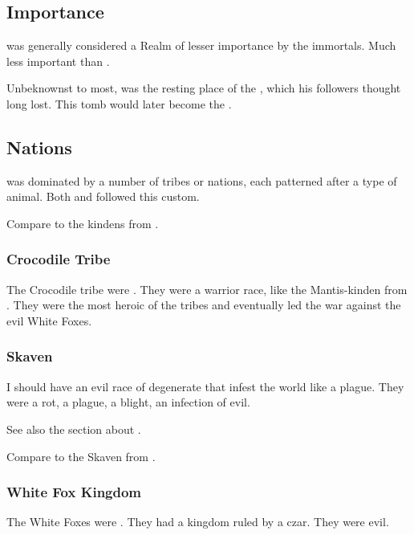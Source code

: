 \subsection{Importance}
\Neevrai was generally considered a Realm of lesser importance by the immortals. 
Much less important than \Azmith. 

Unbeknownst to most, \Neevrai was the resting place of the , which his followers thought long lost. 
This tomb would later become the . 









\subsection{Nations}
\Neevrai was dominated by a number of tribes or nations, each patterned after a type of animal. 
Both \humans and \scathae followed this custom. 

Compare to the kindens from \cite{AdrianTchaikovsky:ShadowsoftheApt}. 





\subsubsection{Crocodile Tribe}
The Crocodile tribe were \scathae.
They were a warrior race, like the Mantis-kinden from \cite{AdrianTchaikovsky:ShadowsoftheApt}. 
They were the most heroic of the tribes and eventually led the war against the evil White Foxes. 





\subsubsection{Skaven}
I should have an evil race of degenerate \humans that infest the world like a plague. 
They were a rot, a plague, a blight, an infection of evil. 

See also the section about .

Compare to the Skaven from \cite{RPG:Warhammer}. 





\subsubsection{White Fox Kingdom}
The White Foxes were \humans. 
They had a kingdom ruled by a czar.
They were evil. 

